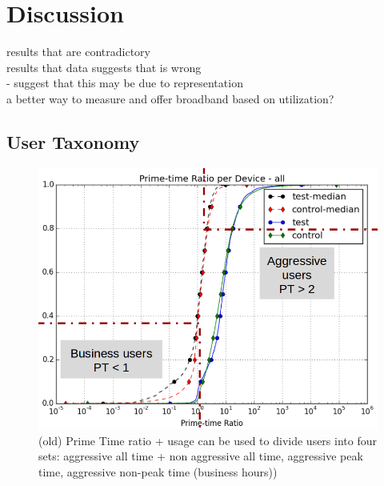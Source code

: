 \section{Discussion}
\label{sec:discussion}
results that are contradictory\\
results that data suggests that is wrong\\ 
- suggest that this may be due to representation\\
a better way to measure and offer broadband based on utilization?

\subsection{User Taxonomy}
\label{subsec:taxonomy}


\begin{figure}[t!]
\begin{minipage}{1\linewidth}
\centering
\includegraphics[width=\linewidth]{figures/cdf-prime-time-ratio[replace].png}
\caption{(old) Prime Time ratio + usage can be used to divide users into four sets: aggressive all time + non aggressive all time, aggressive peak time, aggressive non-peak time (business hours))}
\label{fig:CDF-prime-time-ratio}
\end{minipage}
\end{figure}




